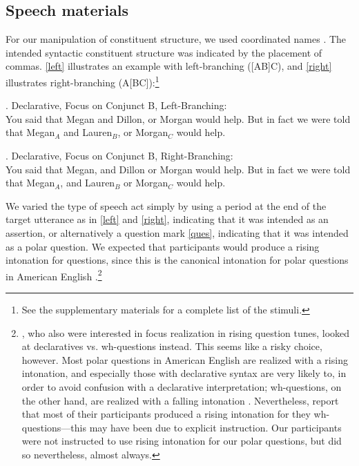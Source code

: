 \documentclass[preprint,review,12pt,authoryear,times]{elsarticle}
\begin{document}
\subsection{Speech materials}

For our manipulation of constituent structure, we used coordinated names \citep[following][]{lehis73, vanden92, wagner05recursion, fery10b,kentn13,petro17}. The intended syntactic constituent structure was indicated by the placement of commas.  \ref{left} illustrates an example with left-branching ([AB]C), and \ref{right} illustrates right-branching (A[BC]):\footnote{See the supplementary materials for a complete list of the stimuli.}

\ex. Declarative, Focus on Conjunct B, Left-Branching:\\
 {\footnotesize You said that Megan and Dillon, or Morgan would help. But in fact we were told that Megan$_A$ and Lauren$_B$, or Morgan$_C$ would help.}\label{left}
 
\ex. Declarative,  Focus on Conjunct B, Right-Branching:\\
 {\footnotesize You said that Megan, and Dillon or Morgan would help. But in fact we were told that Megan$_A$, and Lauren$_B$ or Morgan$_C$ would help.}\label{right}
 
We varied the type of speech act simply by using a period at the end of the target utterance as in \ref{left} and \ref{right}, indicating that it was intended as an assertion, or alternatively a question mark \ref{ques}, indicating that it was intended as a polar question. We expected that participants would produce a rising intonation for questions, since this is the canonical intonation for polar questions in American English \citep{ladd08, hedberg2010prosody}.\footnote{\citet{eady86}, who also were interested in focus realization in rising question tunes, looked at declaratives vs. wh-questions instead. This seems like a risky choice, however. Most polar questions in American English are realized with a rising intonation, and especially those with declarative syntax are very likely to, in order to avoid confusion with a declarative interpretation; wh-questions, on the other hand, are realized with a falling intonation \citep{hedberg2010prosody}. Nevertheless, \citet{eady86} report that most of their participants produced a rising intonation for they wh-questions---this may have been due to explicit instruction. Our participants were not instructed to use rising intonation for our polar questions, but did so nevertheless, almost always.}
\end{document}
